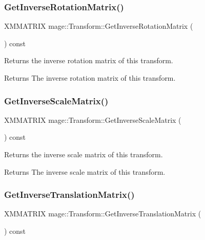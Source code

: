 \subsubsection{\texorpdfstring{Get\+Inverse\+Rotation\+Matrix()}{GetInverseRotationMatrix()}}
{\footnotesize\ttfamily X\+M\+M\+A\+T\+R\+IX mage\+::\+Transform\+::\+Get\+Inverse\+Rotation\+Matrix (\begin{DoxyParamCaption}{ }\end{DoxyParamCaption}) const\hspace{0.3cm}{\ttfamily [private]}}

Returns the inverse rotation matrix of this transform.

\begin{DoxyReturn}{Returns}
The inverse rotation matrix of this transform. 
\end{DoxyReturn}
\hypertarget{structmage_1_1_transform_a31da6a53e73a6254bc36cd0348c65cda}{}\label{structmage_1_1_transform_a31da6a53e73a6254bc36cd0348c65cda} 
\subsubsection{\texorpdfstring{Get\+Inverse\+Scale\+Matrix()}{GetInverseScaleMatrix()}}
{\footnotesize\ttfamily X\+M\+M\+A\+T\+R\+IX mage\+::\+Transform\+::\+Get\+Inverse\+Scale\+Matrix (\begin{DoxyParamCaption}{ }\end{DoxyParamCaption}) const\hspace{0.3cm}{\ttfamily [private]}}

Returns the inverse scale matrix of this transform.

\begin{DoxyReturn}{Returns}
The inverse scale matrix of this transform. 
\end{DoxyReturn}
\hypertarget{structmage_1_1_transform_a4cd7f7143c49772a83adfbd1d75dd475}{}\label{structmage_1_1_transform_a4cd7f7143c49772a83adfbd1d75dd475} 
\subsubsection{\texorpdfstring{Get\+Inverse\+Translation\+Matrix()}{GetInverseTranslationMatrix()}}
{\footnotesize\ttfamily X\+M\+M\+A\+T\+R\+IX mage\+::\+Transform\+::\+Get\+Inverse\+Translation\+Matrix (\begin{DoxyParamCaption}{ }\end{DoxyParamCaption}) const\hspace{0.3cm}{\ttfamily [private]}}

